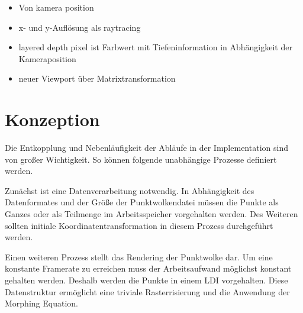 \documentclass[hyperref, beleg, german]{cgvpub}
\begin{document}
\begin{itemize}
\item Von kamera position
\item x- und y-Auflösung als raytracing
\item layered depth pixel ist Farbwert mit Tiefeninformation in Abhängigkeit der
Kameraposition
\item neuer Viewport über Matrixtransformation
\end{itemize}

\chapter{Konzeption}

Die Entkopplung und Nebenläufigkeit der Abläufe in der Implementation sind von
großer Wichtigkeit. So können folgende unabhängige Prozesse definiert werden.

Zunächst ist eine Datenverarbeitung notwendig. In Abhängigkeit des
Datenformates und der Größe der Punktwolkendatei müssen die Punkte als Ganzes
oder als Teilmenge im Arbeitsspeicher vorgehalten werden. Des Weiteren sollten
initiale Koordinatentransformation in diesem Prozess durchgeführt werden.

Einen weiteren Prozess stellt das Rendering der Punktwolke dar. Um eine
konstante Framerate zu erreichen muss der Arbeitsaufwand möglichst konstant
gehalten werden. Deshalb werden die Punkte in einem LDI vorgehalten. Diese
Datenstruktur ermöglicht eine triviale Rasterrisierung und die Anwendung der
Morphing Equation.
\end{document}

